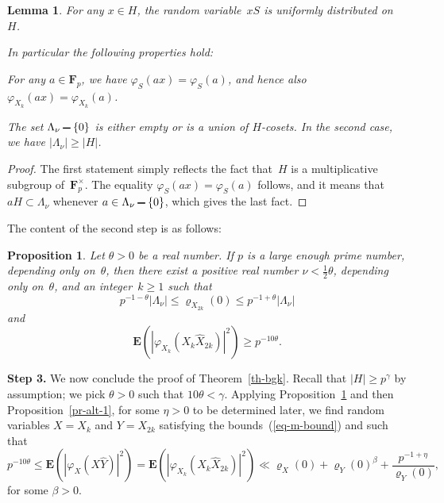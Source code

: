 \documentclass[12pt]{amsart}
\renewcommand{\leq}{\leqslant}
\renewcommand{\geq}{\geqslant}
\numberwithin{equation}{section}
\def\setminus{\mathchoice
    {\mathbin{\vrule height .62ex width 1.61ex depth -.38ex}}%
    {\mathbin{\vrule height .62ex width 1.61ex depth -.38ex}}%
    {\mathbin{\vrule height .50ex width 0.85ex depth -.28ex}}%
    {\mathbin{\vrule height .20ex width 0.570ex depth -.24ex}}%
}
\newcommand{\Ff}{\mathbf{F}}
\newcommand{\expect}{\mathbf{E}}
\renewcommand{\rho}{\varrho}
\newcommand{\demi}{{\textstyle{\frac{1}{2}}}}
\theoremstyle{plain}
\newtheorem{lemma}[theorem]{Lemma}
\newtheorem{proposition}[theorem]{Proposition}
\theoremstyle{remark}
\theoremstyle{definition}
\renewcommand{\geq}{\geqslant}
\renewcommand{\leq}{\leqslant}
\begin{document}
\begin{lemma}\label{lm-uniform-properties}
  For any $x\in H$, the random variable~$xS$ is uniformly distributed
  on~$H$.

  In particular the following properties hold:
  \begin{enumth}
  \item For any $a\in\Ff_p$, we have $\varphi_S(ax)=\varphi_S(a)$, and
    hence also $\varphi_{X_k}(ax)=\varphi_{X_k}(a)$.
  \item The set $\Lambda_{\nu}\setminus\{0\}$ is either empty or is a
    union of $H$-cosets. In the second case, we have
    $|\Lambda_{\nu}|\geq |H|$.
  \end{enumth}
\end{lemma}

\begin{proof}
  The first statement simply reflects the fact that~$H$ is a
  multiplicative subgroup of~$\Ff_p^{\times}$. The equality
  $\varphi_{S}(ax)=\varphi_S(a)$ follows, and it means that
  $aH\subset \Lambda_{\nu}$ whenever $a\in\Lambda_{\nu}\setminus\{0\}$,
  which gives the last fact.
\end{proof}

The content of the second step is as follows:

\begin{proposition}\label{pr-alt-2}
  Let $\theta>0$ be a real number. If $p$ is a large enough prime
  number, depending only on~$\theta$, then there exist a positive real
  number $\nu<\demi\theta$, depending only on~$\theta$, and an
  integer~$k\geq 1$ such that
  \begin{equation}\label{eq-m-bound}
    p^{-1-\theta}|\Lambda_{\nu}|\leq\rho_{X_{2k}}(0)
    \leq p^{-1+\theta}|\Lambda_{\nu}|
  \end{equation}
  and
  \begin{equation}\label{eq-last-bound}
    \expect(|\varphi_{X_k}(X_k\widehat{X}_{2k})|^2)\geq p^{-10\theta}.
  \end{equation}
\end{proposition}

\par\medskip\par

\textbf{Step 3.} We now conclude the proof of
Theorem~\ref{th-bgk}. Recall that $|H|\geq p^{\gamma}$ by assumption; we
pick $\theta>0$ such that $10\theta<\gamma$. Applying
Proposition~\ref{pr-alt-2} and then Proposition~\ref{pr-alt-1}, for some
$\eta>0$ to be determined later, we find random variables $X=X_k$ and
$Y=X_{2k}$ satisfying the bounds~(\ref{eq-m-bound}) and such that
$$
p^{-10\theta}\leq \expect(|\varphi_X(X\widehat{Y})|^2)=
\expect(|\varphi_{X_k}(X_k\widehat{X}_{2k})|^2) \ll
\rho_X(0)+\rho_Y(0)^{\beta}+\frac{p^{-1+\eta}}{\rho_Y(0)},
$$
for some $\beta>0$.
\end{document}
